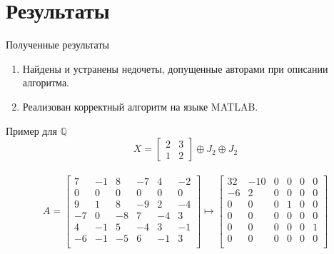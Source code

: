 \documentclass[10pt,pdf,hyperref={unicode}]{beamer}
\begin{document}
\section{Результаты}
\begin{frame}{Полученные результаты}
    \begin{enumerate}
        \item Найдены и устранены недочеты, допущенные авторами при описании алгоритма.
        \item Реализован корректный алгоритм на языке MATLAB.
    \end{enumerate}
\end{frame}
\begin{frame}{Пример для $\mathbb{Q}$}
    \begin{equation*}
        X = \begin{bmatrix}
            2 & 3 \\
            1 & 2
        \end{bmatrix} \oplus J_2 \oplus J_2
    \end{equation*}
    \\
    \begin{equation*}
        A =
        \begin{bmatrix}
             7 & -1 &  8 & -7 &  4 & -2 \\
             0 &  0 &  0 &  0 &  0 &  0 \\
             9 &  1 &  8 & -9 &  2 & -4 \\
            -7 &  0 & -8 &  7 & -4 &  3 \\
             4 & -1 &  5 & -4 &  3 & -1 \\
            -6 & -1 & -5 &  6 & -1 &  3 \\ 
        \end{bmatrix} \mapsto 
        \left[\begin{array}{cc|cc|cc}
             32 & -10 &  0 &  0 &  0 &  0 \\
             -6 &   2 &  0 &  0 &  0 &  0 \\
             \hline
              0 &   0 &  0 &  1 &  0 &  0 \\
              0 &   0 &  0 &  0 &  0 &  0 \\
              \hline
              0 &   0 &  0 &  0 &  0 &  1 \\
              0 &   0 &  0 &  0 &  0 &  0 \\ 
        \end{array}\right]
    \end{equation*}
\end{frame}
\end{document}
